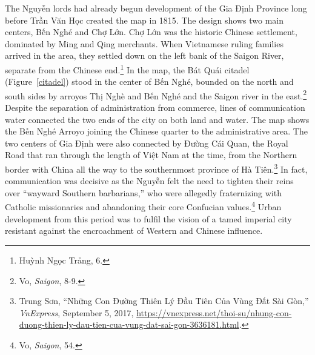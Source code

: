 \en

\begin{figure}[!ht]
\end{figure}

\vi
The Nguyễn lords had already begun development of the Gia Định Province long before Trần Văn Học created the map in 1815. The design shows two main centers, Bến Nghé and Chợ Lớn. Chợ Lớn was the historic Chinese settlement, dominated by Ming and Qing merchants. When Vietnamese ruling families arrived in the area, they settled down on the left bank of the Saigon River, separate from the Chinese end.\footnote{Huỳnh Ngọc Trảng, 6.} In the map, the Bát Quái citadel (Figure~\ref{citadel}) stood in the center of Bến Nghé, bounded on the north and south sides by arroyos Thị Nghè and Bến Nghé and the Saigon river in the east.\footnote{Vo, \textit{Saigon}, 8-9.} Despite the separation of administration from commerce, lines of communication water connected the two ends of the city on both land and water. The map shows the Bến Nghé Arroyo joining the Chinese quarter to the administrative area. The two centers of Gia Định were also connected by Đường Cái Quan, the Royal Road that ran through the length of Việt Nam at the time, from the Northern border with China all the way to the southernmost province of Hà Tiên.\footnote{Trung Sơn, “Những Con Đường Thiên Lý Đầu Tiên Của Vùng Đất Sài Gòn,” \textit{VnExpress}, September 5, 2017, \url{https://vnexpress.net/thoi-su/nhung-con-duong-thien-ly-dau-tien-cua-vung-dat-sai-gon-3636181.html}.} In fact, communication was decisive as the Nguyễn felt the need to tighten their reins over “wayward Southern barbarians,” who were allegedly fraternizing with Catholic missionaries and abandoning their core Confucian values.\footnote{Vo, \textit{Saigon}, 54.} Urban development from this period was to fulfil the vision of a tamed imperial city resistant against the encroachment of Western and Chinese influence.

